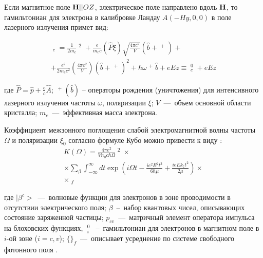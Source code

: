 Если магнитное поле $\boldsymbol{\mathbf{H}}||OZ$, электрическое поле направлено вдоль $\boldsymbol{\mathbf{H}}$, то гамильтониан для электрона в калибровке Ландау $A(-Hy,0,0)$ в поле лазерного излучения примет вид:

\begin{multline} \label{eq:22_10} 
\mathop{\hat{H}}\nolimits_{c} =\frac{1}{2m_{c} } \mathop{\hat{P}}\nolimits^{2} +\frac{e}{m_{c} c} (\hat{P}\xi )\sqrt{\frac{4\pi c^{2} }{V} } (\hat{b}+\mathop{\hat{b}}\nolimits^{+} )+ \\ 
+\frac{e^{2} }{2m_{c} c^{2} } \left(\frac{4\pi c^{2} }{V} \right)(\hat{b}+\mathop{\hat{b}}\nolimits^{+} )^{2} +\hbar \omega \mathop{\hat{b}}\nolimits^{+} \hat{b}+eEz\equiv \mathop{\hat{H}}\nolimits_{c}^{0} +eEz
\end{multline}
 
где $\hat{P}=\hat{p}+\frac{e}{c} \hat{A}$; $\mathop{\hat{b}}\nolimits^{+} (\hat{b})$ -- операторы рождения (уничтожения) для интенсивного лазерного излучения частоты $\omega $, поляризации $\xi $; $V$~---~объем основной области кристалла; $m_{c} $~---~эффективная масса электрона.

Коэффициент межзонного поглощения слабой электромагнитной волны частоты $\Omega $ и поляризации $\xi _{0} $ согласно формуле Кубо \cite{Kubo1957a} можно привести к виду \cite{Sokovnich2004}:
\begin{multline} \label{eq:22_20} 
K(\Omega )=\frac{4\pi e^{2} }{Vn_{0} c\hbar \Omega } \mathop{\left|\frac{p_{cv} \xi _{0} }{m_{0} } \right|}\nolimits^{2} \times  \\
\times \sum _{\beta } \int _{-\infty }^{\infty}  dt \exp \left(i\Omega t-\frac{ie^{2} E^{2} t^{3} }{6\hbar \mu } +\frac{ieEk_{z} t^{2} }{2\mu } \right)\times  \\ 
\times \mathop{\left\{<\beta ^{c} |\exp \left(\frac{it}{\hbar } \mathop{\hat{H}}\nolimits_{v}^{0} \right)\exp \left(-\frac{it}{\hbar } \mathop{\hat{H}}\nolimits_{c}^{0} \right)|\beta ^{c} >\right\}}\nolimits_{f}  
\end{multline} 

где $|\beta ^{c} >$~---~волновые функции для электронов в зоне проводимости в отсутствии электрического поля; $\beta $~--~набор квантовых чисел, описывающих состояние заряженной частицы; $p_{cv} $~---~матричный элемент оператора импульса на блоховских функциях, $\mathop{\hat{H}}\nolimits_{i}^{0} $~--~гамильтониан для электронов в магнитном поле в $i$-ой зоне ($i=c,v$); $\{ \} _{f} $~---~описывает усреднение по системе свободного фотонного поля \cite{Glauber1963,Klauder1968}. 


